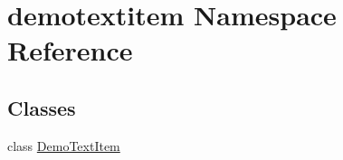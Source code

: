 \hypertarget{namespacedemotextitem}{}\section{demotextitem Namespace Reference}
\label{namespacedemotextitem}
\subsection*{Classes}
\begin{DoxyCompactItemize}
\item 
class \hyperlink{classdemotextitem_1_1DemoTextItem}{Demo\+Text\+Item}
\end{DoxyCompactItemize}
